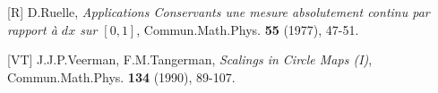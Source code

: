 \item{[R]}  D.Ruelle, {\it Applications Conservants une mesure absolutement 
            continu par rapport \`a $dx$ sur $[0,1]$}, Commun.Math.Phys. 
            {\bf 55} (1977), 47-51.

\item{[VT]} J.J.P.Veerman, F.M.Tangerman, {\it Scalings in Circle Maps (I)},
            Commun.Math.Phys. {\bf 134} (1990), 89-107. 



 


